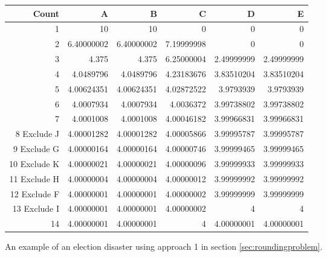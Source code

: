 \documentclass{article}
\begin{document}
\begin{figure}
{\footnotesize

\begin{tabular}{r|rrrrr}
Count & A & B & C & D & E \\ \hline
1 & {\color{violet} 10} & {\color{violet} 10} & 0 & 0 & 0\\
2  & {\color{violet} 6.40000002} & {\color{violet} 6.40000002} & {\color{violet} 7.19999998} & 0 & 0\\
3  & {\color{violet} 4.375} & {\color{violet} 4.375} & {\color{violet} 6.25000004} & 2.49999999 & 2.49999999\\
4  & {\color{violet} 4.0489796} & {\color{violet} 4.0489796} & {\color{violet} 4.23183676} & 3.83510204 & 3.83510204\\
5  & {\color{violet} 4.00624351} & {\color{violet} 4.00624351} & {\color{violet} 4.02872522} & 3.9793939 & 3.9793939\\
6  & {\color{violet} 4.0007934} & {\color{violet} 4.0007934} & {\color{violet} 4.0036372} & 3.99738802 & 3.99738802\\
7  & {\color{violet} 4.0001008} & {\color{violet} 4.0001008} & {\color{violet} 4.00046182} & 3.99966831 & 3.99966831\\
8 Exclude J & {\color{violet} 4.00001282} & {\color{violet} 4.00001282} & {\color{violet} 4.00005866} & 3.99995787 & 3.99995787\\
9 Exclude G & {\color{violet} 4.00000164} & {\color{violet} 4.00000164} & {\color{violet} 4.00000746} & 3.99999465 & 3.99999465\\
10 Exclude K & {\color{violet} 4.00000021} & {\color{violet} 4.00000021} & {\color{violet} 4.00000096} & 3.99999933 & 3.99999933\\
11 Exclude H & {\color{violet} 4.00000004} & {\color{violet} 4.00000004} & {\color{violet} 4.00000012} & 3.99999992 & 3.99999992\\
12 Exclude F & {\color{violet} 4.00000001} & {\color{violet} 4.00000001} & {\color{violet} 4.00000002} & 3.99999999 & 3.99999999\\
13 Exclude I & {\color{violet} 4.00000001} & {\color{violet} 4.00000001} & {\color{violet} 4.00000002} & 4 & 4\\
14  & {\color{violet} 4.00000001} & {\color{violet} 4.00000001} & {\color{violet} 4} & {\color{violet} 4.00000001} & {\color{violet} 4.00000001}\\
\hline
\end{tabular}
}
    \caption{An example of an election disaster using approach 1 in section \ref{sec:roundingproblem}.
}
\end{figure}
\end{document}
